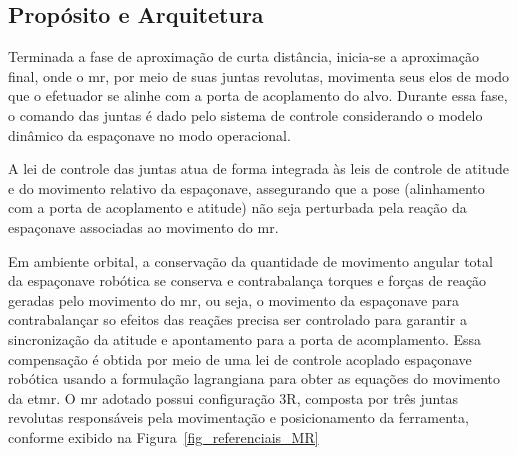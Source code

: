 \subsection{Propósito e Arquitetura}
\label{sec_proposito_arquitetura}

Terminada a fase de aproximação de curta distância, inicia-se a aproximação final, onde o \gls{mr}, por meio de suas juntas revolutas, movimenta seus elos de modo que o efetuador se alinhe com a porta de acoplamento do alvo.
Durante essa fase, o comando das juntas é dado pelo sistema de controle considerando o modelo dinâmico da espaçonave no modo operacional.

A lei de controle das juntas atua de forma integrada às leis de controle de atitude e do movimento relativo da espaçonave, assegurando que a pose (alinhamento com a porta de acoplamento e atitude) não seja perturbada pela reação da espaçonave associadas ao movimento do \gls{mr}.

Em ambiente orbital, a conservação da quantidade de movimento angular total da espaçonave robótica se conserva e contrabalança torques e forças de reação geradas pelo movimento do \gls{mr}, ou seja, o movimento da espaçonave para contrabalançar so efeitos das reaçães precisa ser controlado para garantir a sincronização da atitude e apontamento para a porta de acomplamento.
Essa compensação é obtida por meio de uma lei de controle acoplado espaçonave robótica usando a formulação lagrangiana para obter as equações do movimento da \gls{etmr}.
O \gls{mr} adotado possui configuração 3R, composta por três juntas revolutas responsáveis pela movimentação e posicionamento da ferramenta, conforme exibido na Figura~\ref{fig_referenciais_MR}
